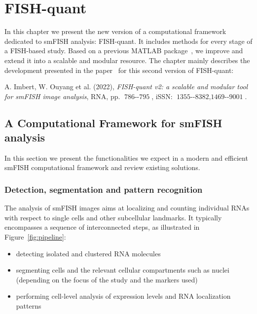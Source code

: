 
\graphicspath{{./figures/chapter1/}}

\chapter{FISH-quant}
\label{ch:chapter1}

\minitoc
\newpage

In this chapter we present the new version of a computational framework dedicated to \ac{smFISH} analysis: FISH-quant.
It includes methods for every stage of a \ac{FISH}-based study.
Based on a previous MATLAB package~\cite{mueller_fish-quant_2013}, we improve and extend it into a scalable and modular resource.
The chapter mainly describes the development presented in the paper~\cite{Imbert_fq_2022} for this second version of FISH-quant:

\begin{center}
	\color{green}
	A. Imbert, W. Ouyang et al. (2022), \textit{FISH-quant v2: a scalable and modular tool for smFISH image analysis}, RNA, pp. $\operatorname{786--795}$, iSSN: $\operatorname{1355--8382, 1469--9001}$.
\end{center}

\section{A Computational Framework for smFISH analysis}
\label{sec:framework}

In this section we present the functionalities we expect in a modern and efficient \ac{smFISH} computational framework and review existing solutions.

\subsection{Detection, segmentation and pattern recognition}
\label{subsec:pipeline_stages}

The analysis of \ac{smFISH} images aims at localizing and counting individual \ac{RNA}s with respect to single cells and other subcellular landmarks.
It typically encompasses a sequence of interconnected steps, as illustrated in Figure~\ref{fig:pipeline}:
\begin{itemize}
	\setlength\itemsep{0.1em}
	\item detecting isolated and clustered \ac{RNA} molecules
	\item segmenting cells and the relevant cellular compartments such as nuclei (depending on the focus of the study and the markers used)
	\item performing cell-level analysis of expression levels and \ac{RNA} localization patterns
\end{itemize}

